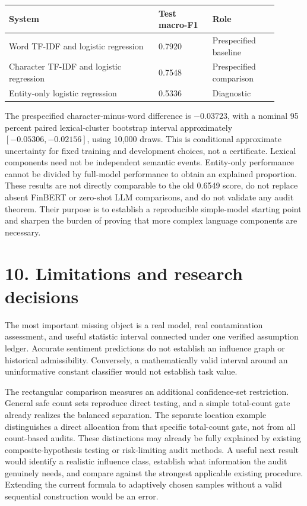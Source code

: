 \documentclass[11pt]{article}
\begin{document}
\begin{center}
\begin{tabular}{@{}p{0.50\linewidth}p{0.18\linewidth}p{0.22\linewidth}@{}}
\toprule
System & Test macro-F1 & Role \\
\midrule
Word TF-IDF and logistic regression & 0.7920 & Prespecified baseline \\
Character TF-IDF and logistic regression & 0.7548 & Prespecified comparison \\
Entity-only logistic regression & 0.5336 & Diagnostic \\
\bottomrule
\end{tabular}
\end{center}

The prespecified character-minus-word difference is $-0.03723$, with a nominal 95 percent paired lexical-cluster bootstrap interval approximately $[-0.05306,-0.02156]$, using 10,000 draws. This is conditional approximate uncertainty for fixed training and development choices, not a certificate. Lexical components need not be independent semantic events. Entity-only performance cannot be divided by full-model performance to obtain an explained proportion. These results are not directly comparable to the old 0.6549 score, do not replace absent FinBERT or zero-shot LLM comparisons, and do not validate any audit theorem. Their purpose is to establish a reproducible simple-model starting point and sharpen the burden of proving that more complex language components are necessary.

\section*{10. Limitations and research decisions}

The most important missing object is a real model, real contamination assessment, and useful statistic interval connected under one verified assumption ledger. Accurate sentiment predictions do not establish an influence graph or historical admissibility. Conversely, a mathematically valid interval around an uninformative constant classifier would not establish task value.

The rectangular comparison measures an additional confidence-set restriction. General safe count sets reproduce direct testing, and a simple total-count gate already realizes the balanced separation. The separate location example distinguishes a direct allocation from that specific total-count gate, not from all count-based audits. These distinctions may already be fully explained by existing composite-hypothesis testing or risk-limiting audit methods. A useful next result would identify a realistic influence class, establish what information the audit genuinely needs, and compare against the strongest applicable existing procedure. Extending the current formula to adaptively chosen samples without a valid sequential construction would be an error.
\end{document}
